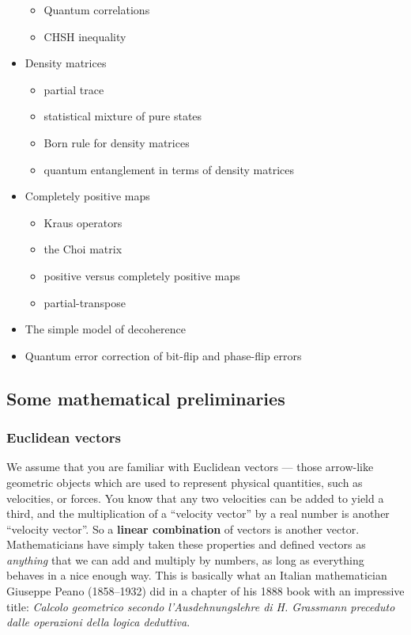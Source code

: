 \documentclass[fleqn]{article}
\providecommand{\tightlist}{%
  \setlength{\itemsep}{0pt}\setlength{\parskip}{0pt}}
\begin{document}
\begin{itemize}
  \begin{itemize}
  \tightlist
  \item
    Quantum correlations
  \item
    CHSH inequality
  \end{itemize}
\item
  Density matrices

  \begin{itemize}
  \tightlist
  \item
    partial trace
  \item
    statistical mixture of pure states
  \item
    Born rule for density matrices
  \item
    quantum entanglement in terms of density matrices
  \end{itemize}
\item
  Completely positive maps

  \begin{itemize}
  \tightlist
  \item
    Kraus operators
  \item
    the Choi matrix
  \item
    positive versus completely positive maps
  \item
    partial-transpose
  \end{itemize}
\item
  The simple model of decoherence
\item
  Quantum error correction of bit-flip and phase-flip errors
\end{itemize}

\hypertarget{some-mathematical-preliminaries}{%
\subsection{Some mathematical preliminaries}\label{some-mathematical-preliminaries}}

\hypertarget{euclidean-vectors}{%
\subsubsection{Euclidean vectors}\label{euclidean-vectors}}

We assume that you are familiar with Euclidean vectors --- those arrow-like geometric objects which are used to represent physical quantities, such as velocities, or forces.
You know that any two velocities can be added to yield a third, and the multiplication of a ``velocity vector'' by a real number is another ``velocity vector''.
So a \textbf{linear combination} of vectors is another vector.
Mathematicians have simply taken these properties and defined vectors as \emph{anything} that we can add and multiply by numbers, as long as everything behaves in a nice enough way.
This is basically what an Italian mathematician Giuseppe Peano (1858--1932) did in a chapter of his 1888 book with an impressive title: \emph{Calcolo geometrico secondo l'Ausdehnungslehre di H. Grassmann preceduto dalle operazioni della logica deduttiva}.
\end{document}
